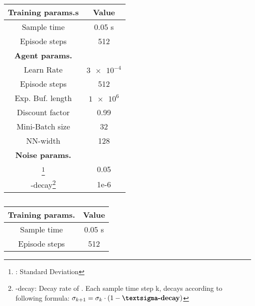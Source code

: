 {\def\arraystretch{1.4}\tabcolsep=5pt
	
\begin{table}
	\parbox{.4\linewidth}{
		\centering
		\begin{tabular}{| c | c |} 
		\hline
		\textbf{Training params.s} & \textbf{Value} \\ [0.5ex] 
		\hline
		\hline
		Sample time & 0.05 s \\ 
		
		Episode steps & 512 \\
		
		\hline
		\textbf{Agent params.} &  \\ [0.5ex] 
		\hline
		
		Learn Rate & $\num{3e-4}$ \\
		
		Episode steps & 512 \\
		
		Exp. Buf. length & $\num{1e6}$ \\
		
		Discount factor &  0.99 \\
		
		Mini-Batch size & 32 \\
		
		NN-width & 128 \\
		
		\hline
		\textbf{Noise params.} &  \\ [0.5ex] 
		\hline
		
		\textsigma\footnote{\textsigma: Standard Deviation} & 0.05 \\
		
		\textsigma-decay\footnote{\textsigma-decay: Decay rate of \textsigma. Each sample time step k, \textsigma decays according to following formula: $\sigma_{k+1} = \sigma_k \cdot (1 - \textbf{\textsigma-decay})$} & 1e-6 \\
		
		\hline
	\end{tabular}	
	\caption[DDPG agent parameters]{}
	\label{table:DDPG parameters}
	}
	
	
	\parbox{.4\linewidth}{
		\centering
		\begin{tabular}{| c | c |} 
		\hline
		\textbf{Training params.} & \textbf{Value} \\ [0.5ex] 
		\hline
		\hline
		Sample time & 0.05 s \\ 
		
		Episode steps & 512 \\
		

\end{tabular}}
\end{table}}
